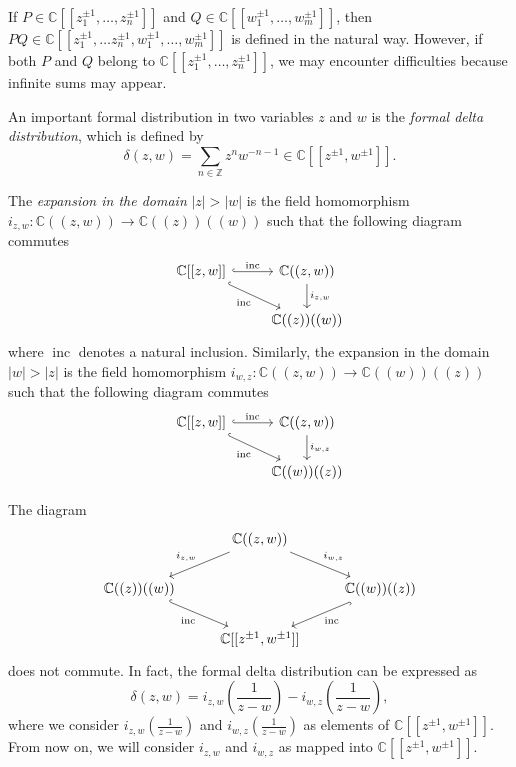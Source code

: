 \documentclass[a4paper, 12pt, reqno]{amsart}
\theoremstyle{remark}
\DeclareMathOperator{\inc}{inc}
\begin{document}
If $P \in \mathbb{C}[[z_1^{\pm1}, \dots, z_n^{\pm1}]]$ and $Q \in \mathbb{C}[[w_1^{\pm1}, \dots, w_m^{\pm1}]]$, then $PQ \in \mathbb{C}[[z_1^{\pm1}, \dots z_n^{\pm1}, w_1^{\pm1}, \dots, w_m^{\pm1}]]$ is defined in the natural way.
However, if both $P$ and $Q$ belong to $\mathbb{C}[[z_1^{\pm1}, \dots, z_n^{\pm1}]]$, we may encounter difficulties because infinite sums may appear.

An important formal distribution in two variables $z$ and $w$ is the \emph{formal delta distribution}, which is defined by
\begin{equation*}
  \delta(z, w) = \sum_{n \in \mathbb{Z}}z^nw^{-n - 1} \in \mathbb{C}[[z^{\pm1}, w^{\pm1}]].
\end{equation*}

The \emph{expansion in the domain} $|z| > |w|$ is the field homomorphism $i_{z, w}: \mathbb{C}((z, w)) \to \mathbb{C}((z))((w))$ such that the following diagram commutes
\begin{equation*}
  \begin{tikzcd}
    {\mathbb{C}[[z, w]]} \arrow[rd, "\inc"', hook] \arrow[r, "\inc", hook] & {\mathbb{C}((z, w))} \arrow[d, "{i_{z, w}}"] \\
    & \mathbb{C}((z))((w))
  \end{tikzcd}
\end{equation*}
where $\inc$ denotes a natural inclusion.
Similarly, the expansion in the domain $|w| > |z|$ is the field homomorphism $i_{w, z}: \mathbb{C}((z, w)) \to \mathbb{C}((w))((z))$ such that the following diagram commutes
\begin{equation*}
  \begin{tikzcd}
    {\mathbb{C}[[z, w]]} \arrow[rd, "\inc"', hook] \arrow[r, "\inc", hook] & {\mathbb{C}((z, w))} \arrow[d, "{i_{w, z}}"] \\
    & \mathbb{C}((w))((z))
  \end{tikzcd}
\end{equation*}

The diagram
\begin{equation*}
  \begin{tikzcd}
    & {\mathbb{C}((z, w))} \arrow[ld, "{i_{z, w}}"'] \arrow[rd, "{i_{w, z}}"] &\\
    \mathbb{C}((z))((w)) \arrow[rd, "\inc"', hook] && \mathbb{C}((w))((z)) \arrow[ld, "\inc", hook] \\
    & {\mathbb{C}[[z^{\pm1}, w^{\pm1}]]} &
  \end{tikzcd}
\end{equation*}
does not commute.
In fact, the formal delta distribution can be expressed as
\begin{equation*}
  \delta(z, w) = i_{z, w}\left(\frac{1}{z - w}\right) - i_{w, z}\left(\frac{1}{z - w}\right),
\end{equation*}
where we consider $i_{z, w}(\frac{1}{z - w})$ and $i_{w, z}(\frac{1}{z - w})$ as elements of $\mathbb{C}[[z^{\pm1}, w^{\pm1}]]$.
From now on, we will consider $i_{z, w}$ and $i_{w, z}$ as mapped into $\mathbb{C}[[z^{\pm1}, w^{\pm1}]]$.
\end{document}
